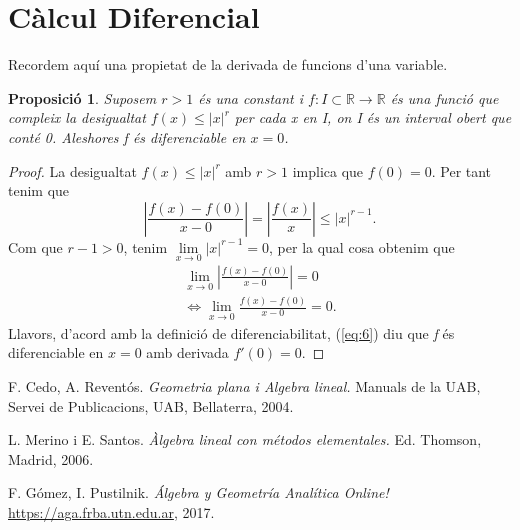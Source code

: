 \documentclass[a4paper,12pt]{article}
\newtheorem{pro}{Proposició}
\begin{document}
\section{Càlcul Diferencial}\label{sec:clc}
Recordem aquí una propietat de la derivada de funcions d'una variable.

\begin{pro}
Suposem $r > 1$ és una constant i $f : I \subset \mathbb{R} \rightarrow \mathbb{R}$ és una funció que compleix la desigualtat $f(x) \le |x|^{r}$ per cada x en I, on I és un interval obert que conté 0. Aleshores f és diferenciable en $x=0$.
\end{pro}

\begin{proof}
La desigualtat $f(x) \leq |x|^{r}$ amb $r>1$ implica que $f(0)=0$. Per tant tenim que
$$\left|\frac{f(x)-f(0)}{x-0}\right|=\left|\frac{f(x)}{x}\right| \leq |x|^{r-1}.$$
Com que $r-1 >0$, tenim $\lim\limits_{x \to 0}|x|^{r-1}=0$, per la qual cosa obtenim que
\begin{align}
\lim\limits_{x \to 0}\left|\frac{f(x)-f(0)}{x-0}\right|=0 \ \nonumber \\
\Leftrightarrow\lim\limits_{x \to 0}\frac{f(x)-f(0)}{x-0}=0. \label{eq:6}
\end{align}
Llavors, d'acord amb la definició de diferenciabilitat, (\ref{eq:6}) diu que \textit{f} és diferenciable en $x=0$ amb derivada $f'(0)=0$.
\end{proof}

\begin{thebibliography}{3}

F. Cedo, A. Reventós. \textit{Geometria plana i Algebra lineal.} Manuals de la UAB, Servei de Publicacions, UAB, Bellaterra, 2004.

L. Merino i E. Santos. \textit{Àlgebra lineal con métodos elementales.} Ed. Thomson, Madrid, 2006.

F. Gómez, I. Pustilnik. \textit{Álgebra y Geometría Analítica Online!} \url{https://aga.frba.utn.edu.ar}, 2017.



\end{thebibliography}
\end{document}
